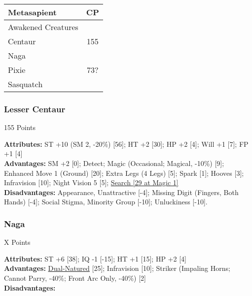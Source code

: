 \begin{multicols*}{3}
	\begin{center}
		\begin{tabularx}{0.32\textwidth}{|X|c|}
			\hline
			Metasapient & CP \\
			\hline
			\hline
			Awakened Creatures & \\
			\hline
			Centaur & 155 \\
			Naga & \\
			Pixie & 73? \\
			Sasquatch & \\
			\hline
		\end{tabularx}
	\end{center}
	
	\subsubsection*{Lesser Centaur}
	\begin{flushright}
		155 Points
	\end{flushright}
	\textbf{Attributes:}
	ST +10 (SM 2, -20\%) [56]; HT +2 [30]; HP +2 [4]; Will +1 [7]; FP +1 [4]
	\\\textbf{Advantages:}
	SM +2 [0]; Detect; Magic (Occasional; Magical, -10\%) [9]; Enhanced Move 1 (Ground) [20]; Extra Legs (4 Legs) [5]; Spark [1]; Hooves [3]; Infravision [10]; Night Vision 5 [5]; \hyperref[search]{Search [29 at Magic 1]}
	\\\textbf{Disadvantages:} 
	Appearance, Unattractive [-4]; Missing Digit (Fingers, Both Hands) [-4]; Social Stigma, Minority Group [-10]; Unluckiness [-10].
	
	\subsubsection*{Naga}
	\begin{flushright}
		X Points
	\end{flushright}
	\textbf{Attributes:} 
	ST +6 [38]; IQ -1 [-15]; HT +1 [15]; HP +2 [4]
	\\\textbf{Advantages:} 
	\hyperref[dual_natured]{Dual-Natured} [25]; Infravision [10]; Striker (Impaling Horns; Cannot Parry, -40\%; Front Arc Only, -40\%) [2]
	\\\textbf{Disadvantages:} 
	

\end{multicols*}
